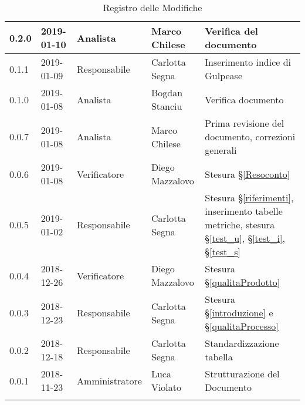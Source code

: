 \begin{center}
\begin{longtable}[c]{|m{}|m{}|m{}|m{}|p{}|}
\hline
\rowcolor{grigio}0.2.0 & 2019-01-10 & Analista & Marco Chilese & Verifica del documento\\
\hline
0.1.1 & 2019-01-09 & Responsabile & Carlotta Segna & Inserimento indice di Gulpease \\
\hline
\rowcolor{grigio}0.1.0 & 2019-01-08 &  Analista & Bogdan Stanciu & Verifica documento \\
\hline
0.0.7 & 2019-01-08 & Analista & Marco Chilese & Prima revisione del documento, correzioni generali\\
\hline
\rowcolor{grigio}0.0.6 & 2019-01-08 & Verificatore & Diego Mazzalovo & Stesura §\ref{Resoconto}\\
\hline
0.0.5 & 2019-01-02 & Responsabile & Carlotta Segna & Stesura §\ref{riferimenti}, inserimento tabelle metriche, stesura §\ref{test_u}, §\ref{test_i}, §\ref{test_s} \\
\hline
\rowcolor{grigio} 0.0.4 & 2018-12-26 & Verificatore & Diego Mazzalovo  & Stesura §\ref{qualitaProdotto} \\
\hline
0.0.3 & 2018-12-23 & Responsabile  & Carlotta Segna & Stesura §\ref{introduzione} e §\ref{qualitaProcesso} \\
\hline
\rowcolor{grigio} 0.0.2 & 2018-12-18 & Responsabile & Carlotta Segna & Standardizzazione tabella \\
\hline
0.0.1 & 2018-11-23 & Amministratore & Luca Violato & Strutturazione del Documento \\

\hline
\caption{Registro delle Modifiche}
\end{longtable}
\end{center}